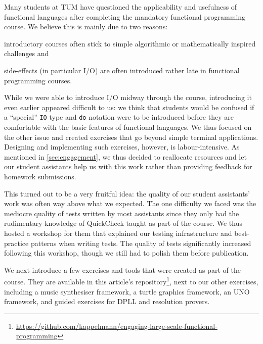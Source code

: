 Many students at TUM have questioned the
applicability and usefulness
of functional languages after completing
the mandatory functional programming course.
We believe this is mainly due to two reasons:
\begin{enumerate*}[label=\arabic*)]
  \item introductory courses often stick
to simple algorithmic or mathematically inspired challenges and
\item side-effects (in particular I/O)
are often introduced rather late
in functional programming courses.
\end{enumerate*}

While we were able to introduce I/O midway through the course,
introducing it even earlier appeared difficult to us:
we think that students would be confused
if a ``special'' \texttt{IO} type and \texttt{do} notation were to
be introduced before they are comfortable
with the basic features of functional languages.
We thus focused on the other issue
and created exercises that go beyond
simple terminal applications.
Designing and implementing such exercises,
however, is labour-intensive.
As mentioned in \cref{sec:engagement},
we thus decided to reallocate resources and
let our student assistants help us with this work
rather than providing feedback for homework submissions.

This turned out to be a very fruitful idea:
the quality of our student assistants' work was often way above what we expected.
The one difficulty we faced was the mediocre quality of
tests written by most assistants
since they only had the rudimentary knowledge of QuickCheck taught as part of the course.
We thus hosted a workshop for them that explained
our testing infrastructure and best-practice
patterns when writing tests.
The quality of tests significantly increased following this workshop,
though we still had to polish them before publication.

We next introduce a few exercises and tools
that were created as part of the course.
They are available in this article's repository\footnote{\url{https://github.com/kappelmann/engaging-large-scale-functional-programming}},
next to our other exercises, including
a music synthesiser framework,
a turtle graphics framework,
an UNO framework,
and guided exercises for DPLL and resolution provers.

